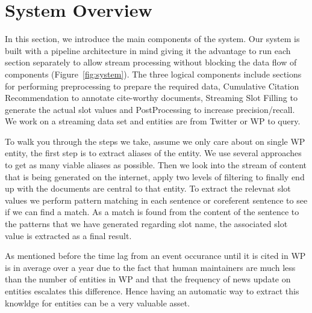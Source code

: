 
\section{System Overview}

In this section, we introduce the main components of the system. Our system is built with a pipeline architecture in mind giving it the advantage to run each section separately to allow stream processing without blocking the data flow of components (Figure~\ref{fig:system}). The three logical components include sections for performing preprocessing to prepare the required data, Cumulative Citation Recommendation to annotate cite-worthy documents, Streaming Slot Filling to generate the actual slot values and PostProcessing to increase precision/recall. We work on a streaming data set and entities are from Twitter or WP to query.


To walk you through the steps we take, assume we only care about on single WP entity, the first step is to extract aliases of the entity. We use several approaches to get as many viable aliases as possible. Then we look into the stream of content that is being generated on the internet, apply two levels of filtering to finally end up with the documents are central to that entity. To extract the relevnat slot values we perform pattern matching in each sentence or coreferent sentence to see if we can find a match. As a match is found from the content of the sentence to the patterns that we have generated regarding slot name, the associated slot value is extracted as a final result.

As mentioned before the time lag from an event occurance until it is cited in WP is in average over a year due to the fact that human maintainers are much less than the number of entities in WP and that the frequency of news update on entities escalates this difference. Hence having an automatic way to extract this knowldge for entities can be a very valuable asset.


